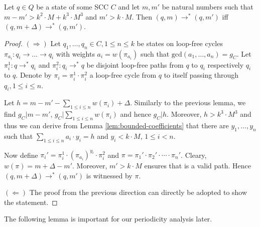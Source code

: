 \documentclass[times,envcountsame]{llncs}
\begin{document}
\begin{lemma}
  Let $q\in Q$ be a state of some SCC $C$ and let $m,m'$ be natural
  numbers such that $m-m'>k^2\cdot M+ k^3\cdot M^3$ and $m'>k\cdot
  M$. Then $(q,m)\rightarrow^*(q,m')$ iff
  $(q,m+\Delta)\rightarrow^*(q,m')$.
\end{lemma}
\begin{proof}
  $(\Rightarrow)$ Let $q_1,\ldots,q_n\in C, 1\le n\le k$ be states on
  loop-free cycles $\pi_{a_i}:q_i\rightarrow \ldots \rightarrow q_i$
  with weights $a_i=w(\pi_{a_i})$ such that
  $\text{gcd}(a_1,\ldots,a_n)=g_C$.  Let $\pi_i^1: q\rightarrow^* q_i$
  and $\pi_i^2: q_i\rightarrow^* q$ be disjoint loop-free paths from
  $q$ to $q_i$ respectively $q_i$ to $q$. Denote by
  $\pi_i=\pi_i^1\cdot \pi_i^2$ a loop-free cycle from $q$ to itself
  passing through $q_i, 1\le i\le n$.

  Let $h=m-m'-\sum_{1\le i\le n}w(\pi_i)+\Delta$. Similarly to the
  previous lemma, we find $g_C|m-m'$, $g_C|\sum_{1\le i\le n}w(\pi_i)$
  and hence $g_C|h$. Moreover, $h>k^3\cdot M^3$ and thus we can derive
  from Lemma \ref{lem:bounded-coefficients} that there are
  $y_1,\ldots, y_n$ such that $\sum_{1\le i\le n}a_i\cdot y_i=h$ and
  $y_i<k\cdot M$, $1\le i<n$.

  Now define $\pi_i'=\pi_i^1\cdot (\pi_{a_i})^{y_i} \cdot \pi_i^2$ and
  $\pi=\pi_1'\cdot\pi_2'\cdot\cdots\cdot\pi_n'$. Cleary,
  $w(\pi)=m+\Delta-m'$. Moreover, $m'> k\cdot M$ ensures that is a
  valid path. Hence $(q,m+\Delta)\rightarrow^*(q,m')$ is witnessed
  by $\pi$.

  $(\Leftarrow)$ The proof from the previous direction can directly
  be adopted to show the statement.
\end{proof}

The following lemma is important for our periodicity analysis later.
\end{document}
